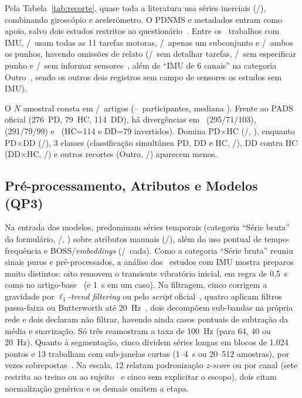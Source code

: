 Pela Tabela~\ref{tab:recorte}, quase toda a literatura usa séries inerciais
(\nModIMU/\nTotal), combinando giroscópio e acelerômetro. O PDNMS e metadados
entram como apoio, salvo dois estudos restritos ao
questionário~\cite{ouabd_parkinsons_2026,padilha_parkinsons_2024}. Entre os
\nModIMU\ trabalhos com IMU, \nTarIMUTodas/\nModIMU\ usam todas as 11 tarefas
motoras, \nTarIMUSubconj/\nModIMU\ apenas um subconjunto e \nPunhoIMUAmbos/\nModIMU\
ambos os punhos, havendo omissões de relato (\nTarIMUNaoRep/\nModIMU\ sem
detalhar tarefas, \nPunhoIMUNaoRep/\nModIMU\ sem especificar punho e
\nSensIMUVazio/\nModIMU\ sem informar sensores~\cite{xing_asa-dsnet_2025}, além de
``IMU de 6 canais'' na categoria Outro~\cite{wei_sgc-rml_2026}, sendo os outros
dois registros sem campo de sensores os estudos sem IMU).

O $N$ amostral consta em \nPartRep/\nTotal\ artigos (\nPartMin--\nPartMax\
participantes, mediana \nPartMediana). Frente ao PADS oficial (276~PD, 79~HC,
114~DD), há divergências em~\cite{djemaa_quantifying_2026} (295/71/103),
\cite{zannat_label-efficient_2026} (291/79/99) e~\cite{vu_simple_2026} (HC=114 e
DD=79 invertidos). Domina PD$\times$HC (\nCenPDHC/\nTotal, \pctCenPDHC),
enquanto PD$\times$DD (\nCenPDDD/\nTotal), 3 classes (classificação simultânea
PD, DD e HC, \nCenTresClasses/\nTotal), DD contra HC (DD$\times$HC,
\nCenDDHC/\nTotal) e outros recortes (Outro, \nCenOutro/\nTotal) aparecem menos.



\subsection{Pré-processamento, Atributos e Modelos (QP3)}

Na entrada dos modelos, predominam séries temporais (categoria ``Série bruta''
do formulário, \nRepBruta/\nTotal, \pctRepBruta) sobre atributos manuais
(\nRepHandcrafted/\nTotal), além do uso pontual de tempo-frequência e
BOSS/\textit{embeddings} (\nRepTF/\nTotal\ cada). Como a categoria ``Série bruta''
reuniu sinais puros e pré-processados, a análise dos \nModIMU\ estudos com IMU
mostra preparos muito distintos: oito removem o transiente vibratório inicial, em regra de 0,5~s como
no artigo-base~\cite{varghese_machine_2024} (e 1~s em um caso). Na filtragem,
cinco corrigem a gravidade por $\ell_1$-\textit{trend filtering} ou pelo
\textit{script} oficial~\cite{padilha_identificacao_2025}, quatro aplicam
filtros passa-faixa ou Butterworth até 20~Hz~\cite{win_checkpd_2026}, dois
decompõem sub-bandas na própria rede e dois declaram não filtrar, havendo ainda
casos pontuais de subtração da média e suavização. Só três reamostram a taxa de
100~Hz (para 64, 40 ou 20~Hz). Quanto à segmentação, cinco dividem séries
longas em blocos de 1.024 pontos e 13 trabalham com sub-janelas curtas
(1--4~s ou 20--512 amostras), por vezes sobrepostas~\cite{gao_coverage-aware_2026}.
Na escala, 12 relatam padronização \textit{z-score} ou por canal (sete restrita
ao treino ou ao sujeito~\cite{djemaa_quantifying_2026} e cinco sem explicitar o
escopo), dois citam normalização genérica e os demais omitem a etapa.

